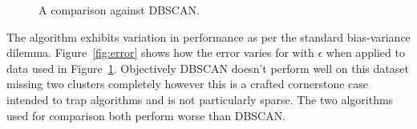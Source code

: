 \documentclass{ecsarticle}     %
\begin{document}
\begin{figure}[ht]
   \centering
   \caption{A comparison against DBSCAN.}
   \label{fig:compare}
\end{figure}

The algorithm exhibits variation in performance as per the standard bias-variance dilemma.
Figure~\ref{fig:error} shows how the error varies for with $\epsilon$ when applied to data used in Figure~\ref{fig:compare}.
Objectively DBSCAN doesn't perform well on this dataset missing two clusters completely however this is a crafted cornerstone case intended to trap algorithms and is not particularly sparse.
The two algorithms used for comparison both perform worse than DBSCAN.
\end{document}
